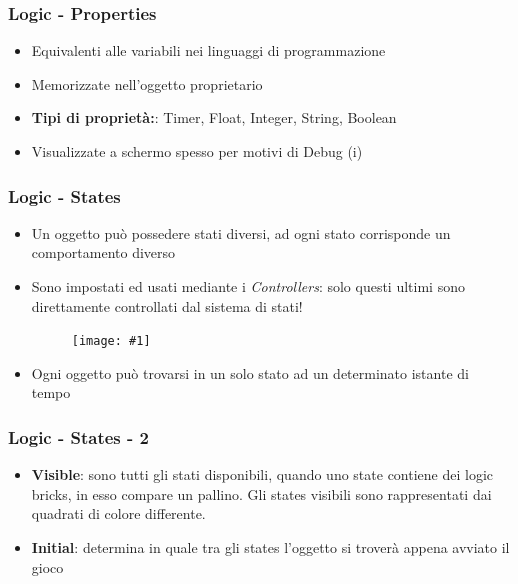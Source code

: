 \documentclass{beamer}
\def\image[#1][#2]{
	\begin{figure}[H]
		\centering
		\texttt{[image: \#1]}
\end{figure}}
\begin{document}
		\begin{frame}
			\frametitle{Logic - Properties}
			\begin{itemize}
				\item Equivalenti alle variabili nei linguaggi di programmazione
				\item Memorizzate nell’oggetto proprietario
				\item \textbf{Tipi di proprietà:}: Timer, Float, Integer, String, Boolean
				\item Visualizzate a schermo spesso per motivi di Debug (i)
			\end{itemize}
		\end{frame}	
		\begin{frame}
			\frametitle{Logic - States}
			\begin{itemize}
				\item Un oggetto può possedere stati diversi, ad ogni stato corrisponde un comportamento diverso %
				\item Sono impostati ed usati mediante i \textit{Controllers}: solo questi ultimi sono direttamente controllati dal sistema di stati! \image[images/states.png][scale=0.3]
				\item Ogni oggetto può trovarsi in un solo stato ad un determinato istante di tempo
			\end{itemize}
		\end{frame}	
		\begin{frame}
			\frametitle{Logic - States - 2}
			\begin{itemize}
				\item\textbf{Visible}: sono tutti gli stati disponibili, quando uno state contiene dei logic bricks, in esso compare un pallino. Gli states visibili sono rappresentati dai quadrati di colore differente.
				\item\textbf{Initial}: determina in quale tra gli states l'oggetto si troverà appena avviato il gioco
			\end{itemize}
		\end{frame}	
\end{document}
